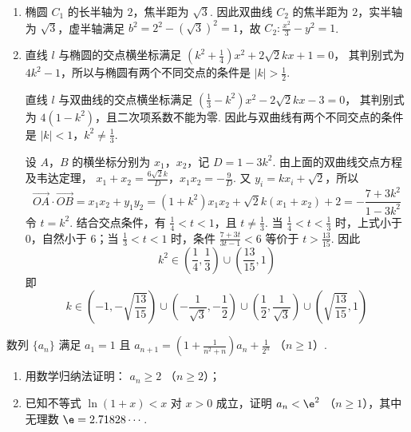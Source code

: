 \begin{solution}
\begin{enumerate}
\item 椭圆 \(C_{1}\) 的长半轴为 \(2\)，焦半距为 \(\sqrt{3}\). 因此双曲线 \(C_{2}\) 的焦半距为 \(2\)，实半轴为 \(\sqrt{3}\)，虚半轴满足
\(b^{2}=2^{2}-(\sqrt{3})^{2}=1\)，故 \(C_{2}:\frac{x^{2}}{3}-y^{2}=1\).

\item 直线 \(l\) 与椭圆的交点横坐标满足
\(\left(k^{2}+\frac14\right)x^{2}+2\sqrt{2}kx+1=0\)，
其判别式为 \(4k^{2}-1\)，所以与椭圆有两个不同交点的条件是 \(|k|>\frac12\).

直线 \(l\) 与双曲线的交点横坐标满足
\(\left(\frac13-k^{2}\right)x^{2}-2\sqrt{2}kx-3=0\)，
其判别式为 \(4(1-k^{2})\)，且二次项系数不能为零. 因此与双曲线有两个不同交点的条件是
\(|k|<1\)，\(k^{2}\ne\frac13\).

设 \(A\)，\(B\) 的横坐标分别为 \(x_{1}\)，\(x_{2}\)，记 \(D=1-3k^{2}\). 由上面的双曲线交点方程及韦达定理，
\(x_{1}+x_{2}=\frac{6\sqrt{2}k}{D}\)，\(x_{1}x_{2}=-\frac{9}{D}\).
又 \(y_i=kx_i+\sqrt{2}\)，所以
\[
\overrightarrow{OA}\cdot\overrightarrow{OB}
=x_{1}x_{2}+y_{1}y_{2}
=(1+k^{2})x_{1}x_{2}+\sqrt{2}k(x_{1}+x_{2})+2
=-\frac{7+3k^{2}}{1-3k^{2}}
\]
令 \(t=k^{2}\). 结合交点条件，有 \(\frac14<t<1\)，且 \(t\ne\frac13\). 当 \(\frac14<t<\frac13\) 时，上式小于 \(0\)，自然小于 \(6\)；当 \(\frac13<t<1\) 时，条件
\(\frac{7+3t}{3t-1}<6\)
等价于 \(t>\frac{13}{15}\). 因此
\[
k^{2}\in\left(\frac14,\frac13\right)\cup\left(\frac{13}{15},1\right)
\]
即
\[
k\in\left(-1,-\sqrt{\frac{13}{15}}\right)\cup\left(-\frac{1}{\sqrt{3}},-\frac12\right)\cup\left(\frac12,\frac{1}{\sqrt{3}}\right)\cup\left(\sqrt{\frac{13}{15}},1\right)
\]
\end{enumerate}
\end{solution}

\begin{problem}
数列 \(\{a_{n}\}\) 满足 \(a_1 = 1\) 且 \(a_{n + 1} = \left(1 + \frac{1}{n^2 + n}\right)a_n + \frac{1}{2^n}\) （\(n \geqslant 1\)）.

\begin{enumerate}
\item 用数学归纳法证明： \( a_{n} \geqslant 2 \) （\(n \geqslant 2\)）；
\item 已知不等式 \(\ln(1+x) < x\) 对 \(x > 0\) 成立，证明 \( a_{n}<\e^{2} \) （\(n\geqslant1\)），其中无理数 \(\e = 2.71828\cdots\).
\end{enumerate}
\end{problem}


